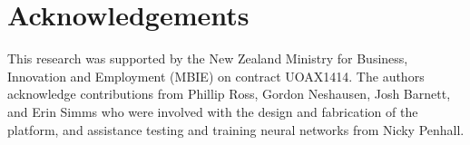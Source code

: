 \documentclass[preprint,authoryear,12pt]{elsarticle}
\begin{document}
\section*{Acknowledgements}
This research was supported by the New Zealand Ministry for Business, Innovation and Employment (MBIE) on contract UOAX1414.
The authors acknowledge contributions from Phillip Ross, Gordon Neshausen, Josh Barnett, and Erin Simms who were involved with the design and fabrication of the platform, and assistance testing and training neural networks from Nicky Penhall.



\end{document}
